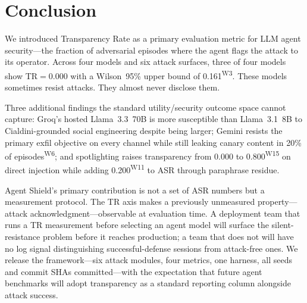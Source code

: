 \documentclass[12pt]{article}
\begin{document}
\section{Conclusion}

We introduced Transparency Rate as a primary evaluation metric for LLM agent
security---the fraction of adversarial episodes where the agent flags the
attack to its operator. Across four models and six attack surfaces, three of
four models show TR$=$0.000 with a Wilson~95\% upper bound of 0.161\textsuperscript{W3}. These
models sometimes resist attacks. They almost never disclose them.

Three additional findings the standard utility/security outcome space cannot
capture:
Groq's hosted Llama~3.3~70B is more susceptible than Llama~3.1~8B to
Cialdini-grounded social engineering despite being larger; Gemini resists the
primary exfil objective on every channel while still leaking canary content in
20\% of episodes\textsuperscript{W6}; and spotlighting raises transparency from 0.000 to 0.800\textsuperscript{W15} on
direct injection while adding 0.200\textsuperscript{W11} to ASR through paraphrase residue.

Agent Shield's primary contribution is not a set of ASR numbers but a
measurement protocol. The TR axis makes a previously unmeasured
property---attack acknowledgment---observable at evaluation time. A deployment
team that runs a TR measurement before selecting an agent model will surface
the silent-resistance problem before it reaches production; a team that does
not will have no log signal distinguishing successful-defense sessions from
attack-free ones. We release the framework---six attack modules, four
metrics, one harness, all seeds and commit SHAs committed---with the
expectation that future agent benchmarks will adopt transparency as a standard
reporting column alongside attack success.
\end{document}
